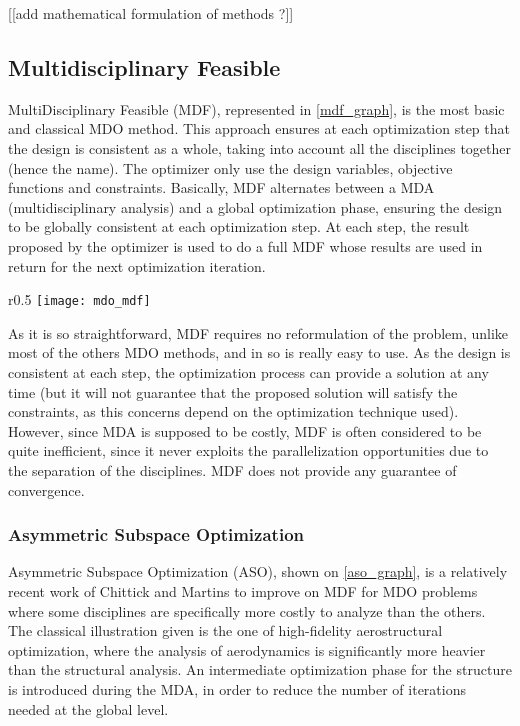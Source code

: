[[add mathematical formulation of methods ?]]

\subsection{Multidisciplinary Feasible}

MultiDisciplinary Feasible (MDF), represented in \figurename{} \ref{mdf_graph}, is the most basic and classical MDO method. This approach ensures at each optimization step that the design is consistent as a whole, taking into account all the disciplines together (hence the name). The optimizer only use the design variables, objective functions and constraints.
Basically, MDF alternates between a MDA (multidisciplinary analysis) and a global optimization phase, ensuring the design to be globally consistent at each optimization step. At each step, the result proposed by the optimizer is used to do a full MDF whose results are used in return for the next optimization iteration.

\begin{wrapfigure}{r}{0.5\textwidth}
\centering
\texttt{[image: mdo\_mdf]}
\caption{MDF method}\label{mdf_graph}
\end{wrapfigure}

As it is so straightforward, MDF requires no reformulation of the problem, unlike most of the others MDO methods, and in so is really easy to use. As the design is consistent at each step, the optimization process can provide a solution at any time (but it will not guarantee that the proposed solution will satisfy the constraints, as this concerns depend on the optimization technique used). However, since MDA is supposed to be costly, MDF is often considered to be quite inefficient, since it never exploits the parallelization opportunities due to the separation of the disciplines. MDF does not provide any guarantee of convergence.

\subsubsection{Asymmetric Subspace Optimization}

Asymmetric Subspace Optimization (ASO), shown on \figurename{} \ref{aso_graph}, is a relatively recent work of Chittick and Martins \cite{Chittick:2007:B} to improve on MDF for MDO problems where some disciplines are specifically more costly to analyze than the others. The classical illustration given is the one of high-fidelity aerostructural optimization, where the analysis of aerodynamics is significantly more heavier than the structural analysis. An intermediate optimization phase for the structure is introduced during the MDA, in order to reduce the number of iterations needed at the global level.

